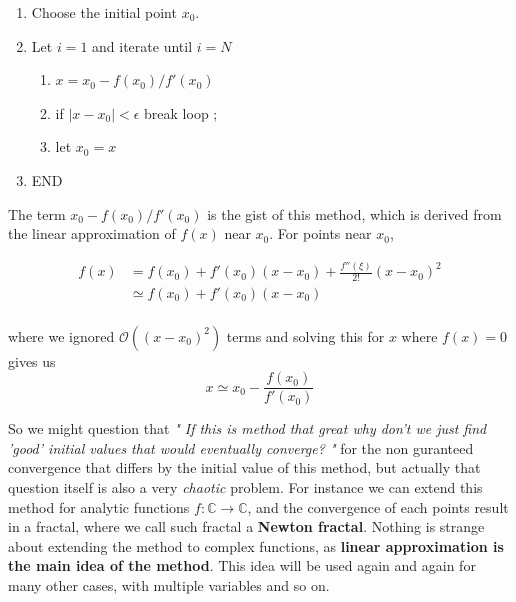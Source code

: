 \documentclass[paper=a4, fontsize=11pt]{scrartcl}
\begin{document}
\begin{enumerate}[label=\arabic*)]
	\item Choose the initial point $x_0$.
	\item Let $i=1$ and iterate until $i=N$
	\begin{enumerate}[label=(\arabic*)]
		\item $x=x_0 - f(x_0)/f'(x_0)$
		\item if $|x-x_0|<\epsilon$ break loop ;
		\item let $x_0=x$
	\end{enumerate}
	\item  END\\
\end{enumerate}

The term $x_0 - f(x_0)/f'(x_0)$ is the gist of this method, which is derived from the linear approximation of $f(x)$ near $x_0$. For points near $x_0$,

\begin{equation}\nonumber
	\begin{split}
		f(x) &= f(x_0) + f'(x_0)(x-x_0)+ \frac{f''(\xi)}{2!}(x-x_0)^2 \\
		&\simeq f(x_0) + f'(x_0)(x-x_0)
	\end{split}
\end{equation}\\

where we ignored $\mathcal{O}((x-x_0)^2)$ terms and solving this for $x$ where $f(x)=0$ gives us 
\vspace{0.15in}
\begin{equation}\nonumber
x\simeq x_0 - \frac{f(x_0)}{f'(x_0)}
\end{equation}
\vspace{0.15in}

So we might question that \textit{" If this is method that great why don't we just find 'good' initial values that would eventually converge? "} for the non guranteed convergence that differs by the initial value of this method, but actually that question itself is also a very \textit{chaotic} problem. For instance we can extend this method for analytic functions $f:\mathbb{C}\to\mathbb{C}$, and the convergence of each points result in a fractal, where we call such fractal a \textbf{Newton fractal}. Nothing is strange about extending the method to complex functions, as \textbf{linear approximation is the main idea of the method}. This idea will be used again and again for many other cases, with multiple variables and so on.\\
\end{document}
